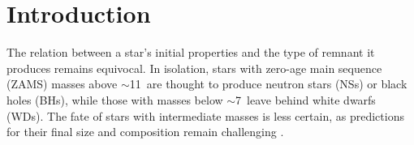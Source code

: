 \documentclass[main.tex]{subfiles}
\begin{document}
    
    {
        \minitoc
        \newpage
    }
    
    
\section{Introduction} \label{sec:ch2:intro}

The relation between a star's initial properties and the type of remnant it produces remains equivocal.  In isolation, stars with zero-age main sequence 
(ZAMS)  masses above $\sim $11\msun\ are  thought to produce 
neutron stars (NSs) or black holes (BHs), while those with 
masses below $\sim$7\msun\ leave behind white dwarfs (WDs). The 
fate of stars with intermediate masses is less certain, as 
predictions for their final size and composition remain  
challenging \citep[][and references therein]{dec07:siess, Poelarends:2007ip, doherty2015, Farmer:2015afs}. 
\end{document}
